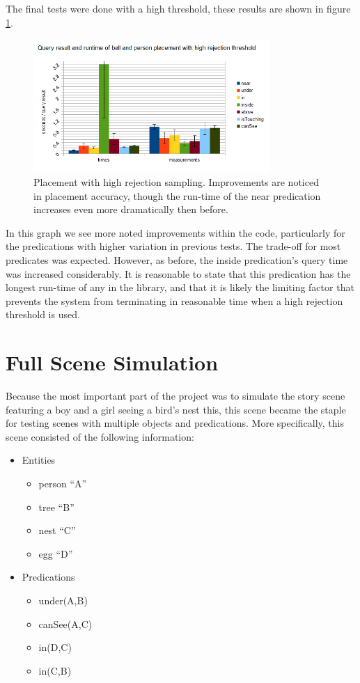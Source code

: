 The final tests were done with a high threshold, these results are shown in figure \ref{fig:binary_place_ballAndPerson_highThresh}.
\begin{figure}[h]
	\begin{center}
		\includegraphics[width=0.8\textwidth]{figures/binary_place_ballAndPerson_highThresh.png}
	\end{center}
	\caption{Placement with high rejection sampling. Improvements are noticed in placement accuracy, though the run-time of the near predication increases even more dramatically then before.}
	\label{fig:binary_place_ballAndPerson_highThresh}
\end{figure}
In this graph we see more noted improvements within the code, particularly for the predications with higher variation in previous tests. The trade-off for most predicates was expected. However, as before, the inside predication's query time was increased considerably. It is reasonable to state that this predication has the longest run-time of any in the library, and that it is likely the limiting factor that prevents the system from terminating in reasonable time when a high rejection threshold is used.

\section{Full Scene Simulation}
Because the most important part of the project was to simulate the story scene featuring a boy and a girl seeing a bird's nest this, this scene became the staple for testing scenes with multiple objects and predications.
More specifically, this scene consisted of the following information:
\begin{itemize}
	\item Entities
	\begin{itemize}
		\item person ``A'' 
		\item tree ``B''
		\item nest ``C''
		\item egg ``D''
	\end{itemize}
	
	\item Predications 
	\begin{itemize}
		\item under(A,B)
		\item canSee(A,C)
		\item in(D,C)
		\item in(C,B)
	\end{itemize}
\end{itemize}

